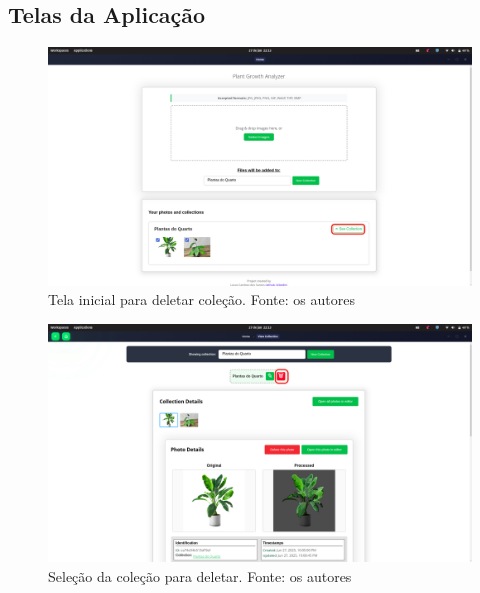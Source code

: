 \subsection{Telas da Aplicação}

\begin{figure}[H]
    \centering
    \includegraphics[width=1\textwidth]{../figures/screens/uc009/Screenshot from 2025-06-27 22-13-27.png}
    \caption{Tela inicial para deletar coleção. Fonte: os autores}
    \label{fig:uc009-screen1}
\end{figure}

\begin{figure}[H]
    \centering
    \includegraphics[width=1\textwidth]{../figures/screens/uc009/Screenshot from 2025-06-27 22-13-32.png}
    \caption{Seleção da coleção para deletar. Fonte: os autores}
    \label{fig:uc009-screen2}
\end{figure}

